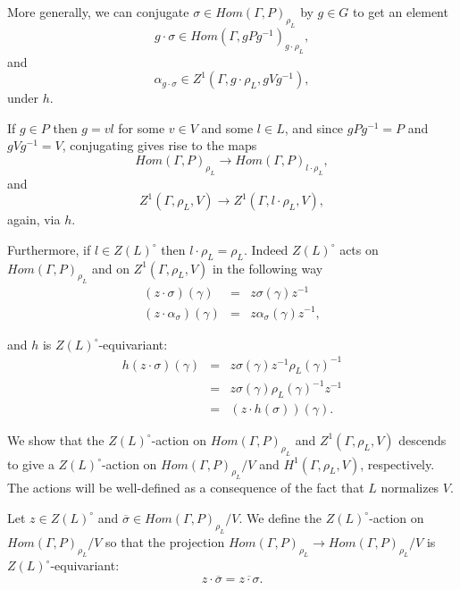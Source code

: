 More generally, we can conjugate $\sigma\in Hom(\Gamma, P)_{\rho_L}$ by $g \in G$ to get an element 
\begin{displaymath}
  g \cdot \sigma \in Hom(\Gamma, gPg^{-1})_{g\cdot\rho_L},
\end{displaymath}
and
\begin{displaymath}
  \alpha_{g \cdot \sigma} \in Z^1(\Gamma, g\cdot\rho_L, gVg^{-1}),
\end{displaymath}
under $h$.

If $g\in P$ then $g=vl$ for some $v\in V$ and some $l\in L$, and since $gPg^{-1} = P$ and $gVg^{-1} = V$, conjugating gives rise to the maps
\begin{displaymath}
  Hom(\Gamma, P)_{\rho_L} \rightarrow Hom(\Gamma, P)_{l\cdot\rho_L},
\end{displaymath}
and
\begin{displaymath}
  Z^1(\Gamma, \rho_L, V)\rightarrow Z^1(\Gamma, l\cdot\rho_L, V),
\end{displaymath}
again, via $h$.

Furthermore, if $l\in Z(L)^\circ$ then $l\cdot\rho_L = \rho_L$. Indeed $Z(L)^\circ$ acts on $Hom(\Gamma, P)_{\rho_L}$ and on $Z^1(\Gamma, \rho_L, V)$ in the following way
\begin{eqnarray*}
  (z \cdot \sigma) (\gamma) &=& z \sigma(\gamma) z^{-1} \\
  (z \cdot \alpha_\sigma) (\gamma) &=&  z \alpha_\sigma(\gamma) z^{-1},
\end{eqnarray*}

and $h$ is $Z(L)^\circ$-equivariant:
\begin{eqnarray*}
  h(z \cdot \sigma)(\gamma) &=&  z \sigma(\gamma) z^{-1} \rho_L(\gamma)^{-1} \\
  &=& z \sigma(\gamma) \rho_L(\gamma)^{-1} z^{-1} \\
  &=& (z \cdot h(\sigma))(\gamma).
\end{eqnarray*}

We show that the $Z(L)^\circ$-action on $Hom(\Gamma, P)_{\rho_L}$ and $Z^1(\Gamma, \rho_L, V)$ descends to give a $Z(L)^\circ$-action on $Hom(\Gamma, P)_{\rho_L}/V$ and $H^1(\Gamma, \rho_L, V)$, respectively. The actions will be well-defined as a consequence of the fact that $L$ normalizes $V$.

Let $z \in Z(L)^\circ$ and $\overline{\sigma} \in Hom(\Gamma, P)_{\rho_L}/V$. We define the $Z(L)^\circ$-action on $Hom(\Gamma, P)_{\rho_L}/V$ so that the projection $Hom(\Gamma, P)_{\rho_L} \rightarrow Hom(\Gamma, P)_{\rho_L}/V$ is $Z(L)^\circ$-equivariant:
\begin{displaymath}
  z \cdot \overline{\sigma} = \overline{z \cdot \sigma}.
\end{displaymath}

